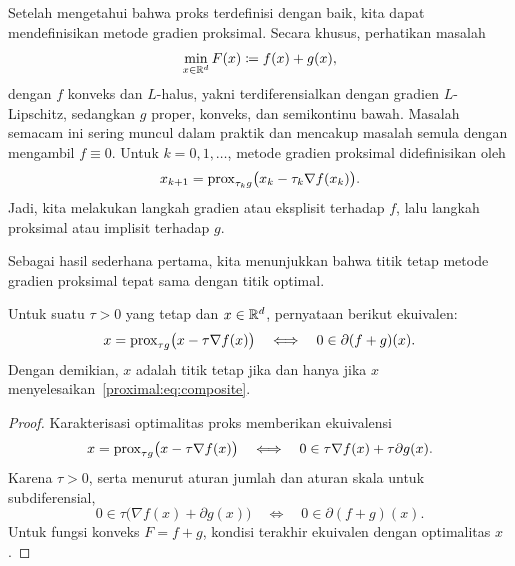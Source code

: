 Setelah mengetahui bahwa proks terdefinisi dengan baik, kita dapat mendefinisikan metode gradien proksimal. Secara khusus, perhatikan masalah
\begin{equation}\label{proximal:eq:composite}
    \min_{x\in\mathbb{R}^d}F(x)\coloneqq f(x)+g(x),
\end{equation}
dengan \(f\) konveks dan \(L\)-halus, yakni terdiferensialkan dengan gradien \(L\)-Lipschitz, sedangkan \(g\) proper, konveks, dan semikontinu bawah. Masalah semacam ini sering muncul dalam praktik dan mencakup masalah semula dengan mengambil \(f\equiv0\). Untuk \(k=0,1,\dots\), metode gradien proksimal didefinisikan oleh
\begin{equation}\label{proximal:eq:prox_grad}
    \begin{aligned}
        x_{k+1}=\mathrm{prox}_{\tau_k g}\bigl(x_k-\tau_k\nabla f(x_k)\bigr).
    \end{aligned}
\end{equation}
Jadi, kita melakukan langkah gradien atau eksplisit terhadap \(f\), lalu langkah proksimal atau implisit terhadap \(g\).

Sebagai hasil sederhana pertama, kita menunjukkan bahwa titik tetap metode gradien proksimal tepat sama dengan titik optimal.
\begin{lemma}
    Untuk suatu \(\tau>0\) yang tetap dan \(x\in\mathbb{R}^d\), pernyataan berikut ekuivalen:
    \begin{equation}
        x=\mathrm{prox}_{\tau g}\bigl(x-\tau\nabla f(x)\bigr)
        \quad\Longleftrightarrow\quad
        0\in\partial(f+g)(x).
    \end{equation}
    Dengan demikian, \(x\) adalah titik tetap jika dan hanya jika \(x\) menyelesaikan~\eqref{proximal:eq:composite}.
\end{lemma}
\begin{proof}
    Karakterisasi optimalitas proks memberikan ekuivalensi
    \begin{equation}
        x=\mathrm{prox}_{\tau g}\bigl(x-\tau\nabla f(x)\bigr)
        \quad\Longleftrightarrow\quad
        0\in\tau\nabla f(x)+\tau\partial g(x).
    \end{equation}
    Karena \(\tau>0\), serta menurut aturan jumlah dan aturan skala untuk subdiferensial,
    \begin{equation}
        0\in\tau\bigl(\nabla f(x)+\partial g(x)\bigr)
        \quad\Longleftrightarrow\quad
        0\in\partial(f+g)(x).
    \end{equation}
    Untuk fungsi konveks \(F=f+g\), kondisi terakhir ekuivalen dengan optimalitas \(x\).
\end{proof}

